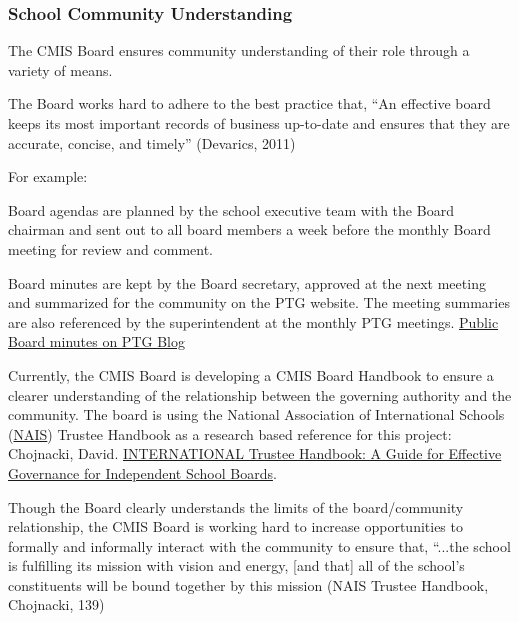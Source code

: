 \subsubsection{School Community Understanding}



\begin{findings}
The CMIS Board ensures community understanding of their role through a variety of means. 

The Board works hard to adhere to the best practice that, “An effective board keeps its most important records of business up-to-date and ensures that they are accurate, concise, and timely” (Devarics, 2011)

For example:

Board agendas are planned by the school executive team with the Board chairman and sent out to all board members a week before the monthly Board meeting for review and comment. 

Board minutes are kept by the Board secretary, approved at the next meeting and summarized for the community on the PTG website. The meeting summaries are also referenced by the superintendent at the monthly PTG meetings. \href{http://blogs.cmis.ac.th/ptg/public-board-minutes/}{Public Board minutes on PTG Blog}

Currently, the CMIS Board is developing a CMIS Board Handbook to ensure a clearer understanding of the relationship between the governing authority and the community. The board is using the National Association of International Schools (\href{http://www.nais.org/Articles/Pages/NAIS-Trustee-Handbook-Resources.aspx}{NAIS}) Trustee Handbook as a research based reference for this project: Chojnacki, David. \href{https://www.nais.org/Bookstore/Pages/ProductDetail.aspx?productid=\%7B47CD9104-BC67-E111-9A8C-00505683000D\%7D}{INTERNATIONAL Trustee Handbook: A Guide for Effective Governance for Independent School Boards}. 

Though the Board clearly understands the limits of the board/community relationship, the CMIS Board is working hard to increase opportunities to formally and informally interact with the community to ensure that, “...the school is fulfilling its mission with vision and energy, [and that] all  of the school’s constituents will be bound together by this mission (NAIS Trustee Handbook, Chojnacki, 139)  


\end{findings}
